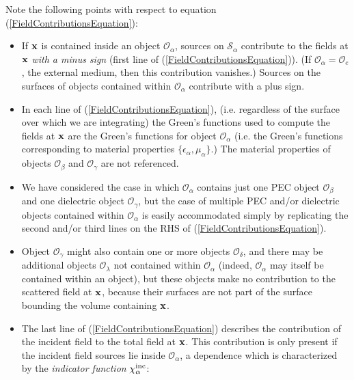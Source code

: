 \documentclass[dvips,letterpaper]{article}
\begin{document}
Note the following points with respect to equation
(\ref{FieldContributionsEquation}):
\begin{itemize}
  \item If $\mathbf{x}$ is contained inside an object 
        $\mathcal{O}_\alpha$, sources on $\mathcal{S}_\alpha$
        contribute to the fields at $\mathbf{x}$ 
        \textit{with a minus sign} (first line of 
        (\ref{FieldContributionsEquation})). 
        (If $\mathcal{O}_\alpha=\mathcal{O}_e$, 
         the external medium, then this contribution vanishes.) 
        Sources on the surfaces of objects contained within 
        $\mathcal{O}_\alpha$ contribute with a plus sign.

  \item In each line of (\ref{FieldContributionsEquation}), 
        (i.e. regardless of the surface over which we are 
        integrating) the Green's functions used to compute
        the fields at $\mathbf{x}$ are the Green's functions for
        object $\mathcal{O}_\alpha$ (i.e. the Green's functions
        corresponding to material properties 
        $\{\epsilon_\alpha,\mu_\alpha\}$.) The material properties
        of objects $\mathcal{O}_\beta$ and $\mathcal{O}_\gamma$
        are not referenced.

  \item We have considered the case in which $\mathcal{O}_\alpha$
        contains just one PEC object $\mathcal{O}_\beta$ 
        and one dielectric object $\mathcal{O}_\gamma$, but 
        the case of multiple PEC and/or dielectric objects contained
        within $\mathcal{O}_\alpha$ is easily accommodated simply 
        by replicating the second and/or third lines on the RHS of 
        (\ref{FieldContributionsEquation}).

  \item Object $\mathcal{O}_\gamma$ might also contain one
        or more objects $\mathcal{O}_\delta$, and there
        may be additional objects $\mathcal{O}_\lambda$ not 
        contained within $\mathcal{O}_\alpha$ 
        (indeed, $\mathcal{O}_\alpha$ may itself be contained within
        an object), but these objects make no contribution
        to the scattered field at $\mathbf{x}$, because their surfaces are 
        not part of the surface bounding the volume containing $\mathbf{x}$.

  \item The last line of (\ref{FieldContributionsEquation}) describes
        the contribution of the incident field to the total field at 
        $\mathbf{x}$.  This contribution is only present if the incident 
        field sources lie inside $\mathcal{O}_\alpha$, a dependence
        which is characterized by the \textit{indicator function}
        $\chi^{\hbox{\scriptsize{inc}}}_\alpha$:


\end{itemize}
\end{document}
